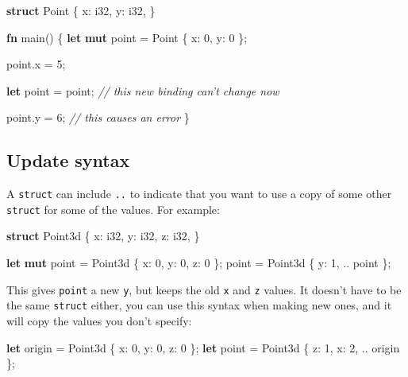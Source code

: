 \documentclass[a4paper,]{book}
\newenvironment{Shaded}{\begin{snugshade}}{\end{snugshade}}
\newcommand{\KeywordTok}[1]{\textcolor[rgb]{0.13,0.29,0.53}{\textbf{{#1}}}}
\newcommand{\DataTypeTok}[1]{\textcolor[rgb]{0.13,0.29,0.53}{{#1}}}
\newcommand{\DecValTok}[1]{\textcolor[rgb]{0.00,0.00,0.81}{{#1}}}
\newcommand{\CommentTok}[1]{\textcolor[rgb]{0.56,0.35,0.01}{\textit{{#1}}}}
\newcommand{\NormalTok}[1]{{#1}}
\begin{document}
\begin{Shaded}
\begin{Highlighting}[]
\KeywordTok{struct} \NormalTok{Point \{}
    \NormalTok{x: }\DataTypeTok{i32}\NormalTok{,}
    \NormalTok{y: }\DataTypeTok{i32}\NormalTok{,}
\NormalTok{\}}

\KeywordTok{fn} \NormalTok{main() \{}
    \KeywordTok{let} \KeywordTok{mut} \NormalTok{point = Point \{ x: }\DecValTok{0}\NormalTok{, y: }\DecValTok{0} \NormalTok{\};}

    \NormalTok{point.x = }\DecValTok{5}\NormalTok{;}

    \KeywordTok{let} \NormalTok{point = point; }\CommentTok{// this new binding can’t change now}

    \NormalTok{point.y = }\DecValTok{6}\NormalTok{; }\CommentTok{// this causes an error}
\NormalTok{\}}
\end{Highlighting}
\end{Shaded}

\subsection{Update syntax}\label{update-syntax}

A \texttt{struct} can include \texttt{..} to indicate that you want to
use a copy of some other \texttt{struct} for some of the values. For
example:

\begin{Shaded}
\begin{Highlighting}[]
\KeywordTok{struct} \NormalTok{Point3d \{}
    \NormalTok{x: }\DataTypeTok{i32}\NormalTok{,}
    \NormalTok{y: }\DataTypeTok{i32}\NormalTok{,}
    \NormalTok{z: }\DataTypeTok{i32}\NormalTok{,}
\NormalTok{\}}

\KeywordTok{let} \KeywordTok{mut} \NormalTok{point = Point3d \{ x: }\DecValTok{0}\NormalTok{, y: }\DecValTok{0}\NormalTok{, z: }\DecValTok{0} \NormalTok{\};}
\NormalTok{point = Point3d \{ y: }\DecValTok{1}\NormalTok{, .. point \};}
\end{Highlighting}
\end{Shaded}

This gives \texttt{point} a new \texttt{y}, but keeps the old \texttt{x}
and \texttt{z} values. It doesn't have to be the same \texttt{struct}
either, you can use this syntax when making new ones, and it will copy
the values you don't specify:

\begin{Shaded}
\begin{Highlighting}[]
\KeywordTok{let} \NormalTok{origin = Point3d \{ x: }\DecValTok{0}\NormalTok{, y: }\DecValTok{0}\NormalTok{, z: }\DecValTok{0} \NormalTok{\};}
\KeywordTok{let} \NormalTok{point = Point3d \{ z: }\DecValTok{1}\NormalTok{, x: }\DecValTok{2}\NormalTok{, .. origin \};}
\end{Highlighting}
\end{Shaded}
\end{document}
